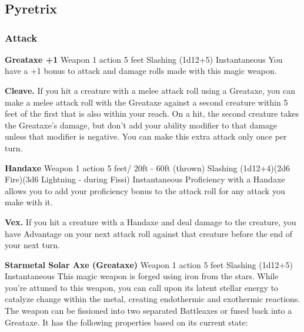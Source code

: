 \chapter*{}

\section{Pyretrix}

\subsection {Attack}
\DndSpellHeader%
  {\textbf{Greataxe +1}}
  {Weapon}
  {1 action}
  {5 feet}
  {Slashing (1d12+5)}
  {Instantaneous}
You have a +1 bonus to attack and damage rolls made with this magic weapon.

\textbf{Cleave.} If you hit a creature with a melee attack roll using a Greataxe, you can make a melee attack roll with the Greataxe against a second creature within 5 feet of the first that is also within your reach. 
On a hit, the second creature takes the Greataxe’s damage, but don’t add your ability modifier to that damage unless that modifier is negative. 
You can make this extra attack only once per turn.


\DndSpellHeader%
  {\textbf{Handaxe}}
  {Weapon}
  {1 action}
  {5 feet/ 20ft - 60ft (thrown)}
  {Slashing (1d12+4)(2d6 Fire)(3d6 Lightning - during Fissi)}
  {Instantaneous}
Proficiency with a Handaxe allows you to add your proficiency bonus to the attack roll for any attack you make with it.

\textbf{Vex.} If you hit a creature with a Handaxe and deal damage to the creature, you have Advantage on your next attack roll against that creature before the end of your next turn.


\DndSpellHeader%
  {\textbf{Starmetal Solar Axe (Greataxe)}}
  {Weapon}
  {1 action}
  {5 feet}
  {Slashing (1d12+5)}
  {Instantaneous}
This magic weapon is forged using iron from the stars. 
While you’re attuned to this weapon, you can call upon its latent stellar energy to catalyze change within the metal, creating endothermic and exothermic reactions.
The weapon can be fissioned into two separated Battleaxes or fused back into a Greataxe. 
It has the following properties based on its current state:

